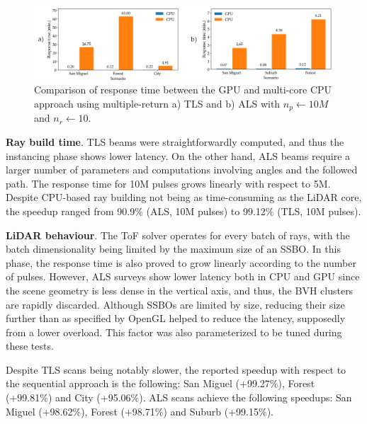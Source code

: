 \begin{figure} [ht]
	\centering
	\includegraphics[width=\linewidth]{figs/lidar_simulation/response_time.png}
	\caption{Comparison of response time between the GPU and multi-core CPU approach using multiple-return a) TLS and b) ALS with $n_p \gets 10M$ and $n_r \gets 10$. }
	\label{fig:lidar_response_time_global}
\end{figure}

\textbf{Ray build time}. TLS beams were straightforwardly computed, and thus the instancing phase shows lower latency. On the other hand, ALS beams require a larger number of parameters and computations involving angles and the followed path. The response time for 10M pulses grows linearly with respect to 5M. Despite CPU-based ray building not being as time-consuming as the LiDAR core, the speedup ranged from 90.9\% (ALS, 10M pulses) to 99.12\% (TLS, 10M pulses).

\textbf{LiDAR behaviour}. The ToF solver operates for every batch of rays, with the batch dimensionality being limited by the maximum size of an SSBO. In this phase, the response time is also proved to grow linearly according to the number of pulses. However, ALS surveys show lower latency both in CPU and GPU since the scene geometry is less dense in the vertical axis, and thus, the BVH clusters are rapidly discarded. Although SSBOs are limited by size, reducing their size further than as specified by OpenGL helped to reduce the latency, supposedly from a lower overload. This factor was also parameterized to be tuned during these tests.

Despite TLS scans being notably slower, the reported speedup with respect to the sequential approach is the following: San Miguel (+99.27\%), Forest (+99.81\%) and City (+95.06\%). ALS scans achieve the following speedups: San Miguel (+98.62\%), Forest (+98.71\%) and Suburb (+99.15\%).

